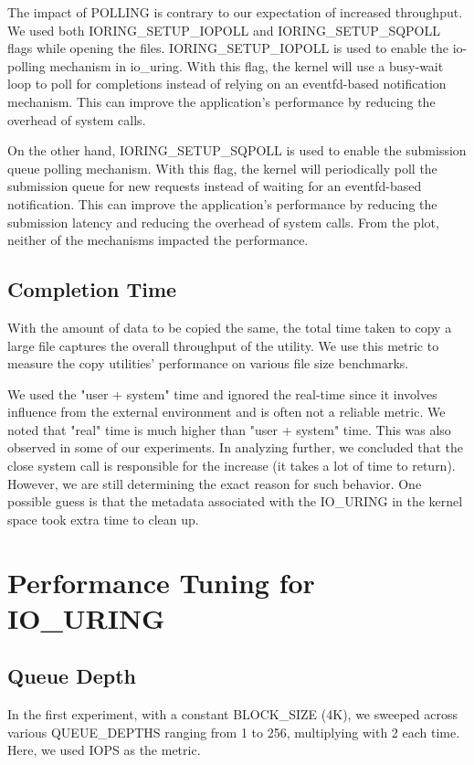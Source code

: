 \documentclass{article}
\begin{document}
The impact of POLLING is contrary to our expectation of increased throughput. We used both IORING\_SETUP\_IOPOLL and IORING\_SETUP\_SQPOLL flags 
while opening the files. IORING\_SETUP\_IOPOLL is used to enable the io-polling mechanism in io\_uring. With this flag, the kernel 
will use a busy-wait loop to poll for completions instead of relying on an eventfd-based notification mechanism. This can improve 
the application's performance by reducing the overhead of system calls.

On the other hand, IORING\_SETUP\_SQPOLL is used to enable the submission queue polling mechanism. With this flag, the kernel will 
periodically poll the submission queue for new requests instead of waiting for an eventfd-based notification. This can improve 
the application's performance by reducing the submission latency and reducing the overhead of system calls. From the plot, neither 
of the mechanisms impacted the performance.


\subsection{Completion Time}
With the amount of data to be copied the same, the total time taken to copy a large file captures the overall throughput of the 
utility. We use this metric to measure the copy utilities' performance on various file size benchmarks. 

We used the "user + system" time and ignored the real-time since it involves influence from the external environment and is often 
not a reliable metric. We noted that "real" time is much higher than "user + system" time. This was also observed in some of our 
experiments. In analyzing further, we concluded that the close system call is responsible for the increase (it takes a lot of time 
to return). However, we are still determining the exact reason for such behavior. One possible guess is that the metadata 
associated with the IO\_URING in the kernel space took extra time to clean up.


\section{Performance Tuning for IO\_URING}
\subsection{Queue Depth}
In the first experiment, with a constant BLOCK\_SIZE (4K), we sweeped across various QUEUE\_DEPTHS ranging from 1 to 256, 
multiplying with 2 each time. Here, we used IOPS as the metric. 
\end{document}
